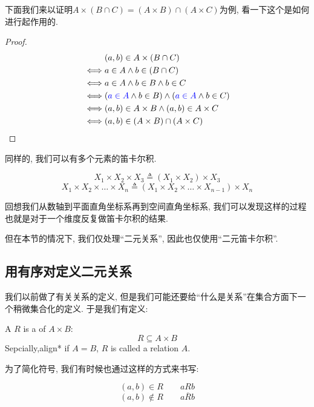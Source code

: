 下面我们来以证明$A \times (B \cap C) = (A \times B) \cap (A \times C)$为例, 看一下这个是如何进行起作用的. 
\begin{proof}
    \setcounter{equation}{0}
    \begin{align*}
      &(a, b) \in A \times (B \cap C) \\
      \iff& a \in A \land b \in (B \cap C) \\
      \iff& a \in A \land b \in B \land b \in C \\
      \iff& (\textcolor{blue}{a \in A} \land b \in B) \land (\textcolor{blue}{a \in A} \land b \in C) \\
      \iff& (a, b) \in A \times B \land (a, b) \in A \times C \\
      \iff& (a, b) \in (A \times B) \cap (A \times C)
  \end{align*}
\end{proof}

同样的, 我们可以有多个元素的笛卡尔积. 

\begin{definition}
  \[
    X_{1} \times X_{2} \times X_{3} \triangleq (X_{1} \times X_{2}) \times X_{3}
  \]
  \[
    X_{1} \times X_{2} \times \dots \times X_{n}
      \triangleq (X_{1} \times X_{2} \times \dots \times X_{n-1}) \times X_{n}
  \]
\end{definition}

回想我们从数轴到平面直角坐标系再到空间直角坐标系, 我们可以发现这样的过程也就是对于一个维度反复做笛卡尔积的结果. 

但在本节的情况下, 我们仅处理``二元关系'', 因此也仅使用``二元笛卡尔积''. 


\subsection{用有序对定义二元关系}

我们以前做了有关关系的定义, 但是我们可能还要给``什么是关系''在集合方面下一个稍微集合化的定义. 于是我们有定义: 
\begin{definition}[关系 (Relations)]
  A  $R$ 
  is a  of $A \times B$:
  \[
    {R \subseteq A \times B}
  \]
  Sepcially,{align*} if $A = B$, $R$ is called a relation  $A$.
\end{definition}

为了简化符号, 我们有时候也通过这样的方式来书写: 

\begin{definition}[Notations]
  \[
    (a, b) \in R \qquad a R b
  \]
  \[
    (a, b) \notin R \qquad a \overline{R} b
  \]
\end{definition}

